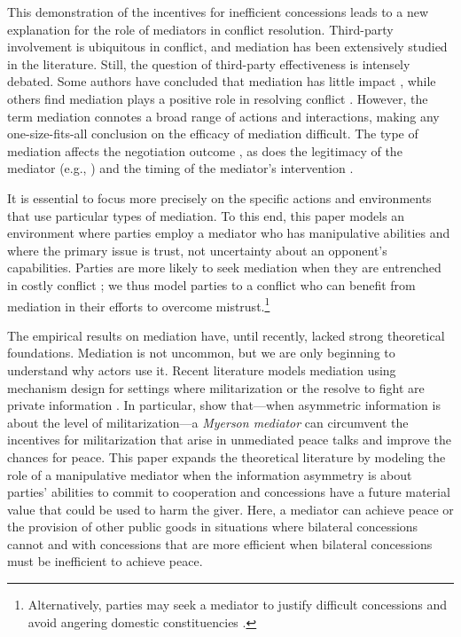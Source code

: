 \documentclass[bibtex,autowc]{apsr_submission}
\begin{document}
This demonstration of the incentives for inefficient concessions leads to a new explanation for the role of mediators in conflict resolution. Third-party involvement is ubiquitous in conflict, and mediation has been extensively studied in the literature. Still, the question of third-party effectiveness is intensely debated. Some authors have concluded that mediation has little impact \citep{bercovitch1996resolving, bercovitch1993nature, fortna2003}, while others find mediation plays a positive role in resolving conflict \citep{dixon1996, beardsley2006mediation}. However, the term mediation connotes a broad range of actions and interactions, making any one-size-fits-all conclusion on the efficacy of mediation difficult. The type of mediation affects the negotiation outcome \citep{bercovitch2000why, beardsley2006mediation}, as does the legitimacy of the mediator (e.g., \cite{duursma2020}) and the timing of the mediator's intervention \citep{greig2005a}.

It is essential to focus more precisely on the specific actions and environments that use particular types of mediation. To this end, this paper models an environment where parties employ a mediator who has manipulative abilities and where the primary issue is trust, not uncertainty about an opponent's capabilities. Parties are more likely to seek mediation when they are entrenched in costly conflict \citep{bercovitch2001negotiation, greig2005, greig2006, terris2005rational, svensson2006mediators}; we thus model parties to a conflict who can benefit from mediation in their efforts to overcome mistrust.\footnote{Alternatively, parties may seek a mediator to justify difficult concessions and avoid angering domestic constituencies \citep{allee2006legitimizing, beardsley2010pain, beardsley2014thirdparty}.}

The empirical results on mediation have, until recently, lacked strong theoretical foundations. Mediation is not uncommon, but we are only beginning to understand why actors use it. Recent literature models mediation using mechanism design for settings where militarization or the resolve to fight are private information \citep{bester2006, fey2009, fey2010, fey2011, horner2010, meirowitz2012, meirowitz2019}. In particular, \cite{meirowitz2019} show that---when asymmetric information is about the level of militarization---a \textit{Myerson mediator} can circumvent the incentives for militarization that arise in unmediated peace talks and improve the chances for peace. This paper expands the theoretical literature by modeling the role of a manipulative mediator when the information asymmetry is about parties' abilities to commit to cooperation and concessions have a future material value that could be used to harm the giver. Here, a mediator can achieve peace or the provision of other public goods in situations where bilateral concessions cannot and with concessions that are more efficient when bilateral concessions must be inefficient to achieve peace. 
\end{document}
